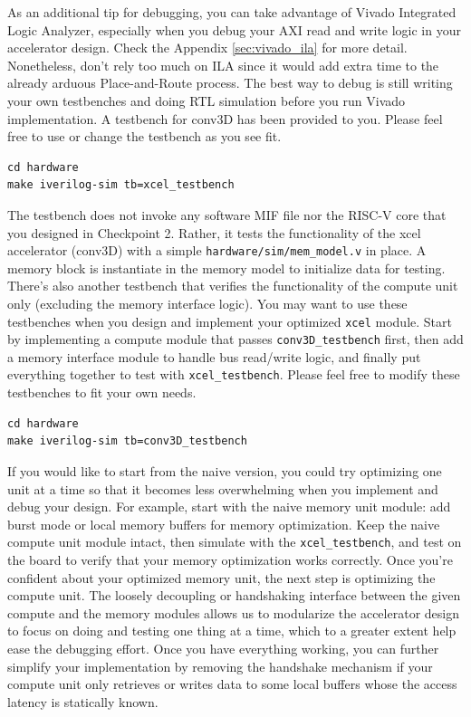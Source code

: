 \documentclass[11pt]{article}
\begin{document}
As an additional tip for debugging, you can take advantage of Vivado Integrated Logic Analyzer, especially when you debug your AXI read and write logic in your accelerator design. Check the Appendix \ref{sec:vivado_ila} for more detail. Nonetheless, don't rely too much on ILA since it would add extra time to the already arduous Place-and-Route process. The best way to debug is still writing your own testbenches and doing RTL simulation before you run Vivado implementation. A testbench for conv3D has been provided to you. Please feel free to use or change the testbench as you see fit.

\begin{verbatim}
cd hardware
make iverilog-sim tb=xcel_testbench
\end{verbatim}

The testbench does not invoke any software MIF file nor the RISC-V core that you designed in Checkpoint 2. Rather, it tests the functionality of the xcel accelerator (conv3D) with a simple \verb|hardware/sim/mem_model.v| in place. A memory block is instantiate in the memory model to initialize data for testing. There's also another testbench that verifies the functionality of the compute unit only (excluding the memory interface logic). You may want to use these testbenches when you design and implement your optimized \verb|xcel| module. Start by implementing a compute module that passes \verb|conv3D_testbench| first, then add a memory interface module to handle bus read/write logic, and finally put everything together to test with \verb|xcel_testbench|. Please feel free to modify these testbenches to fit your own needs.

\begin{verbatim}
cd hardware
make iverilog-sim tb=conv3D_testbench
\end{verbatim}

If you would like to start from the naive version, you could try optimizing one unit at a time so that it becomes less overwhelming when you implement and debug your design. For example, start with the naive memory unit module: add burst mode or local memory buffers for memory optimization. Keep the naive compute unit module intact, then simulate with the \verb|xcel_testbench|, and test on the board to verify that your memory optimization works correctly. Once you're confident about your optimized memory unit, the next step is optimizing the compute unit. The loosely decoupling or handshaking interface between the given compute and the memory modules allows us to modularize the accelerator design to focus on doing and testing one thing at a time, which to a greater extent help ease the debugging effort. Once you have everything working, you can further simplify your implementation by removing the handshake mechanism if your compute unit only retrieves or writes data to some local buffers whose the access latency is statically known.
\end{document}
